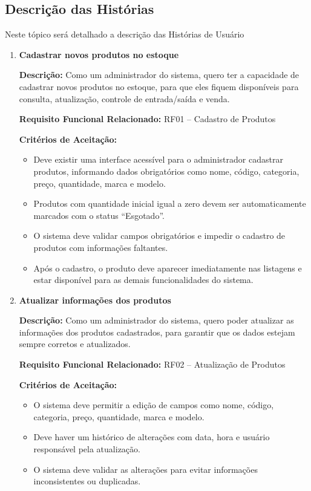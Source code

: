 \documentclass[
	12pt,				%
	openany,			%
	twoside,			%
	a4paper,			%
	english,			%
	brazil				%
	]{abntex2}
\begin{document}
\FloatBarrier

\subsection{Descrição das Histórias}

Neste tópico será detalhado a descrição das Histórias de Usuário

\begin{enumerate}

\item \textbf{Cadastrar novos produtos no estoque}

\textbf{Descri\c{c}\~ao:} Como um administrador do sistema, quero ter a capacidade de cadastrar novos produtos no estoque, para que eles fiquem dispon\'iveis para consulta, atualiza\c{c}\~ao, controle de entrada/sa\'ida e venda.

\textbf{Requisito Funcional Relacionado:} RF01 -- Cadastro de Produtos

\textbf{Crit\'erios de Aceita\c{c}\~ao:}
\begin{itemize}
  \item Deve existir uma interface acess\'ivel para o administrador cadastrar produtos, informando dados obrigat\'orios como nome, c\'odigo, categoria, pre\c{c}o, quantidade, marca e modelo.
  \item Produtos com quantidade inicial igual a zero devem ser automaticamente marcados com o status ``Esgotado''.
  \item O sistema deve validar campos obrigat\'orios e impedir o cadastro de produtos com informa\c{c}\~oes faltantes.
  \item Ap\'os o cadastro, o produto deve aparecer imediatamente nas listagens e estar dispon\'ivel para as demais funcionalidades do sistema.
\end{itemize}

\item \textbf{Atualizar informações dos produtos}

\textbf{Descrição:} Como um administrador do sistema, quero poder atualizar as informações dos produtos cadastrados, para garantir que os dados estejam sempre corretos e atualizados.

\textbf{Requisito Funcional Relacionado:} RF02 -- Atualização de Produtos

\textbf{Critérios de Aceitação:}
\begin{itemize}
  \item O sistema deve permitir a edição de campos como nome, código, categoria, preço, quantidade, marca e modelo.
  \item Deve haver um histórico de alterações com data, hora e usuário responsável pela atualização.
  \item O sistema deve validar as alterações para evitar informações inconsistentes ou duplicadas.
\end{itemize}


\end{enumerate}
\end{document}
